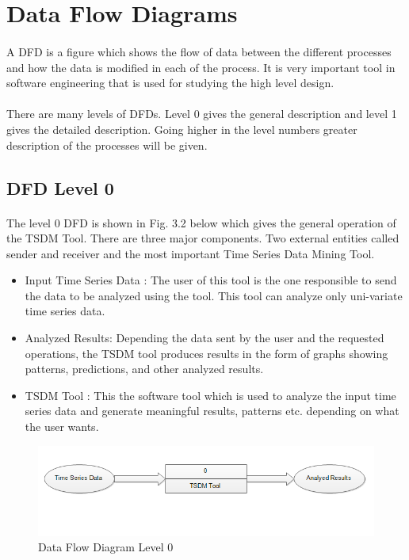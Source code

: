 \documentclass[12pt,a4paper]{report}
\begin{document}
\section{Data Flow Diagrams}
\paragraph{}A DFD is a figure which shows the flow of data between the different processes and how the data is modified in each of the process. It is very important tool in software engineering that is used for studying the high level design.\\
\paragraph{}There are many levels of DFDs. Level 0 gives the general description and level 1 gives the detailed description. Going higher in the level numbers greater description of the processes will be given.
\pagebreak
\subsection{DFD Level 0}
\paragraph{}The level 0 DFD is shown in Fig. 3.2 below which gives the general operation of the TSDM Tool. There are three major components. Two external entities called sender and receiver and the most important Time Series Data Mining Tool.
\begin{itemize}
\item Input Time Series Data : The user of this tool  is the one responsible to send the data to be analyzed using the tool. This tool can analyze only uni-variate time series data.
\item Analyzed Results: Depending the data sent by the user and the requested operations, the TSDM tool produces results in the form of graphs showing patterns, predictions, and other analyzed results.
\item TSDM Tool : This the software tool which is used to analyze the input time series data and generate meaningful results, patterns etc. depending on what the user wants.
\end{itemize}
\begin{figure}[h!]
	\centering
		\includegraphics[scale=0.9]{screenshots/dfd_0.png}
		\caption{Data Flow Diagram Level 0}
\end{figure} 
\pagebreak
\end{document}
